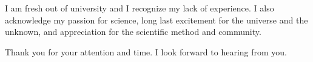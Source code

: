 \documentclass[11pt,a4paper,roman]{moderncv}
\begin{document}

I am fresh out of university and I recognize my lack of experience. I also acknowledge my passion for science, long last excitement for the universe and the unknown, and appreciation for the scientific method and community.

Thank you for your attention and time. I look forward to hearing from you. 

\vspace{0.5cm}

\makeletterclosing
\end{document}
